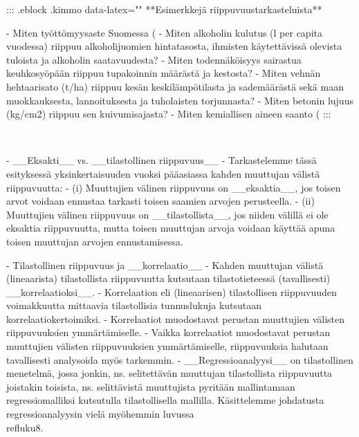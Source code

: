 \documentclass[
]{book}
\begin{document}
\begin{itemize}
::: {.eblock .kimmo data-latex="{}"}
**Esimerkkejä riippuvuustarkasteluista**  

- Miten työttömyysaste Suomessa (%
- Miten alkoholin kulutus (l per capita vuodessa) riippuu alkoholijuomien hintatasosta, ihmisten käytettävissä olevista tuloista ja alkoholin saatavuudesta?  
- Miten todennäköisyys sairastua keuhkosyöpään riippuu tupakoinnin määrästä ja kestosta?  
- Miten vehnän hehtaarisato (t/ha) riippuu kesän keskilämpötilasta ja sademäärästä sekä maan muokkauksesta, lannoituksesta ja tuholaisten torjunnasta?  
- Miten betonin lujuus (kg/cm2)  riippuu sen kuivumisajasta?  
- Miten kemiallisen aineen saanto (%
:::

\
\

- __Eksakti__ vs. __tilastollinen riippuvuus__
  - Tarkastelemme tässä esityksessä yksinkertaisuuden vuoksi pääasiassa kahden muuttujan välistä riippuvuutta:
    - (i) Muuttujien välinen riippuvuus on __eksaktia__, jos toisen arvot voidaan ennustaa tarkasti toisen saamien arvojen perusteella.
    - (ii) Muuttujien välinen riippuvuus on __tilastollista__, jos niiden välillä ei ole eksaktia riippuvuutta, mutta toisen muuttujan arvoja voidaan käyttää apuna toisen muuttujan arvojen ennustamisessa.

- Tilastollinen riippuvuus ja __korrelaatio__
  - Kahden muuttujan välistä (lineaarista) tilastollista riippuvuutta kutsutaan tilastotieteessä (tavallisesti) __korrelaatioksi__.
  - Korrelaation eli (lineaarisen) tilastollisen riippuvuuden voimakkuutta mittaavia tilastollisia tunnuslukuja kutsutaan korrelaatiokertoimiksi.
  - Korrelaatiot muodostavat perustan muuttujien välisten riippuvuuksien ymmärtämiselle.
  - Vaikka korrelaatiot muodostavat perustan muuttujien välisten riippuvuuksien ymmärtämiselle, riippuvuuksia halutaan tavallisesti analysoida myös tarkemmin.
  - __Regressioanalyysi__ on tilastollinen menetelmä, jossa jonkin, ns. selitettävän muuttujan tilastollista riippuvuutta joistakin toisista, ns. selittävistä muuttujista pyritään mallintamaan regressiomalliksi kutsutulla tilastollisella mallilla. Käsittelemme johdatusta regressioanalyysin vielä myöhemmin luvussa \\ref{luku8}.


\end{itemize}
\end{document}
